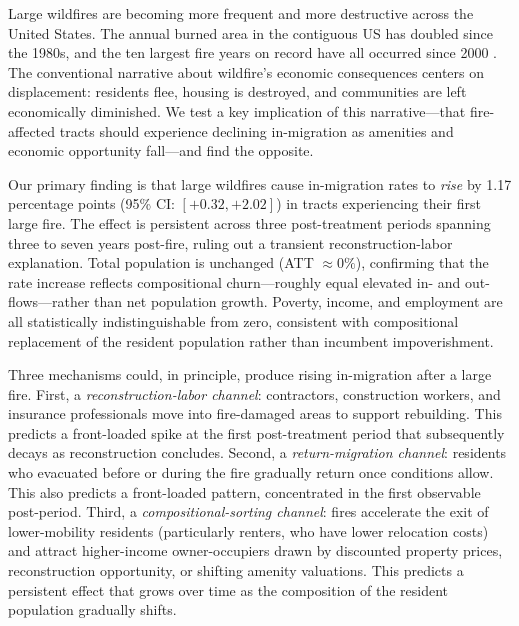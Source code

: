 \documentclass[12pt]{article}
\begin{document}
Large wildfires are becoming more frequent and more destructive across the
United States.
The annual burned area in the contiguous US has doubled since the 1980s,
and the ten largest fire years on record have all occurred since 2000
\citep{coulombe2025fires}.
The conventional narrative about wildfire's economic consequences
centers on displacement: residents flee, housing is destroyed,
and communities are left economically diminished.
We test a key implication of this narrative---that fire-affected tracts
should experience declining in-migration as amenities and economic
opportunity fall---and find the opposite.

Our primary finding is that large wildfires cause in-migration rates
to \emph{rise} by 1.17 percentage points (95\% CI: $[+0.32, +2.02]$)
in tracts experiencing their first large fire.
The effect is persistent across three post-treatment periods spanning
three to seven years post-fire, ruling out a transient
reconstruction-labor explanation.
Total population is unchanged (ATT $\approx 0\%$), confirming that
the rate increase reflects compositional churn---roughly equal elevated
in- and out-flows---rather than net population growth.
Poverty, income, and employment are all statistically indistinguishable
from zero, consistent with compositional replacement of the resident
population rather than incumbent impoverishment.

Three mechanisms could, in principle, produce rising in-migration after
a large fire.
First, a \emph{reconstruction-labor channel}: contractors, construction
workers, and insurance professionals move into fire-damaged areas to
support rebuilding.
This predicts a front-loaded spike at the first post-treatment period that
subsequently decays as reconstruction concludes.
Second, a \emph{return-migration channel}: residents who evacuated
before or during the fire gradually return once conditions allow.
This also predicts a front-loaded pattern, concentrated in the first
observable post-period.
Third, a \emph{compositional-sorting channel}: fires accelerate
the exit of lower-mobility residents (particularly renters, who have lower
relocation costs) and attract higher-income owner-occupiers drawn by
discounted property prices, reconstruction opportunity, or shifting
amenity valuations.
This predicts a persistent effect that grows over time as the composition
of the resident population gradually shifts.
\end{document}
